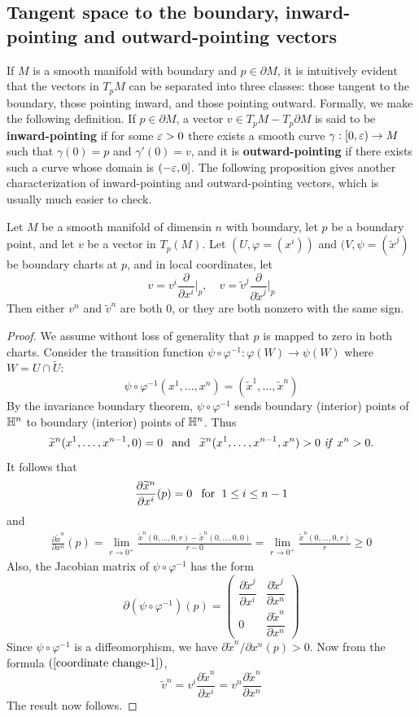 \subsection{Tangent space to the boundary, inward-pointing and outward-pointing vectors}
If $M$ is a smooth manifold with boundary and $p\in\partial M$, it is intuitively evident that the vectors in $T_pM$ can be separated into three classes: those tangent to the boundary, those pointing inward, and those pointing outward. Formally, we make the following definition. If $p\in\partial M$, a vector $v\in T_pM-T_p\partial M$ is said to be \textbf{inward-pointing} if for some $\varepsilon>0$ there exists a smooth curve $\gamma:[0,\varepsilon)\to M$ such that $\gamma(0)=p$ and $\gamma'(0)=v$, and it is \textbf{outward-pointing} if there exists such a curve whose domain is $(-\varepsilon,0]$. The following proposition gives another characterization of inward-pointing and outward-pointing vectors, which is usually much easier to check.
\begin{lemma}\label{inward pointing lem}
Let $M$ be a smooth manifold of dimensin $n$ with boundary, let $p$ be a boundary point, and let $v$ be a vector in $T_p(M)$. Let $(U,\varphi=(x^i))$ and $(V,\psi=(\widetilde{x}^j)$ be boundary charts at $p$, and in local coordinates, let
\[v=v^i\frac{\partial}{\partial x^i}\Big|_p,\quad v=\widetilde{v}^j\frac{\partial}{\partial\widetilde{x}^j}\Big|_p\]
Then either $v^n$ and $\widetilde{v}^n$ are both $0$, or they are both nonzero with the same sign.
\end{lemma}
\begin{proof}
We assume without loss of generality that $p$ is mapped to zero in both charts. Consider the transition function $\psi\circ\varphi^{-1}:\varphi(W)\to\psi(W)$ where $W=U\cap\widetilde{U}$:
\[\psi\circ\varphi^{-1}(x^1,\dots,x^n)=(\widetilde{x}^1,\dots,\widetilde{x}^n)\]
By the invariance boundary theorem, $\psi\circ\varphi^{-1}$ sends boundary (interior) points of $\mathbb{H}^n$ to boundary (interior) points of $\mathbb{H}^n$. Thus
\[\widetilde{x}^n(x^1,\dots,x^{n-1},0)=0\hspace{8pt}\text{and}\hspace{8pt}\widetilde{x}^n(x^1,\dots,x^{n-1},x^n)>0\text{ \textit{if} } x^n>0.\]
It follows that
\[\frac{\partial\widetilde{x}^n}{\partial x^i}(p)=0\hspace{8pt}\text{for}\hspace{6pt} 1\leq i\leq n-1\]
and
\begin{align*}
\frac{\partial\widetilde{x}^n}{\partial x^n}(p)=\lim_{r\to 0^+}\frac{\widetilde{x}^n(0,\dots,0,r)-\widetilde{x}^n(0,\dots,0,0)}{r-0}=\lim_{r\to 0^+}\frac{\widetilde{x}^n(0,\dots,0,r)}{r}\geq 0
\end{align*}
Also, the Jacobian matrix of $\psi\circ\varphi^{-1}$ has the form
\[\partial(\psi\circ\varphi^{-1})(p)=\begin{pmatrix}
\dfrac{\partial\widetilde{x}^j}{\partial x^i}&\dfrac{\partial\widetilde{x}^j}{\partial x^n}\\[8pt]
0&\dfrac{\partial\widetilde{x}^n}{\partial x^n}
\end{pmatrix}\]
Since $\psi\circ\varphi^{-1}$ is a diffeomorphism, we have $\partial\widetilde{x}^n/\partial x^n(p)>0$. Now from the formula $(\ref{coordinate change-1})$,
\[\widetilde{v}^n=v^i\frac{\partial\widetilde{x}^n}{\partial x^i}=v^n\frac{\partial\widetilde{x}^n}{\partial x^n}\]
The result now follows.
\end{proof}
